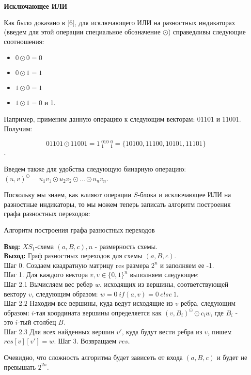 \documentclass[a4paper,12pt]{extarticle}
\theoremstyle{plain} %
\begin{document}
\begin{large}
\textbf{Исключающее ИЛИ}

 Как было доказано в [6], для исключающего ИЛИ на разностных индикаторах (введем для этой операции специальное обозначение $\odot$) справедливы следующие соотношения:

\begin{itemize}
\item $0 \odot 0 = 0$
\item $0 \odot 1 = 1$
\item $1 \odot 0= 1$
\item $1 \odot 1 = 0$ и 1. 
\end{itemize}

Например, применим данную операцию к следующим векторам: 01101 и 11001. Получим:

$$01101 \odot 11001 = 1~_{1}^010~_{1}^0 = \{10100, 11100, 10101, 11101\}$$.

Введем также для удобства следующую бинарную операцию: $(u, v)^{\odot} = u_1v_1 \odot u_2v_2 \odot ... \odot u_nv_n$.

Поскольку мы знаем, как влияют операции $S$-блока и исключающее ИЛИ на разностные индикаторы, то мы можем теперь записать алгоритм построения графа разностных переходов:

\begin{algorithm}[H]
\caption{Алгоритм построения графа разностных переходов}
\label{diff_graph_construct}
\textbf{Вход:} $XS_1$-схема $(a, B, c), n$ - размерность схемы.\\
\textbf{Выход:} Граф разностных переходов для схемы $(a, B, c)$.\\
Шаг 0. Создаем квадратную матрицу res размера $2^n$ и заполняем ее -1. \\
Шаг 1. Для каждого вектора $v, v \in \{0, 1\}^n$ выполняем следующее: \\
Шаг 2.1 Вычисляем вес ребер $w$, исходящих из вершины, соответствующей вектору $v$, следующим образом: $w = 0~ if (a,v) = 0 ~else ~1$.\\
Шаг 2.2 Находим все вершины, куда ведут исходящие из $v$ ребра, следующим образом: $i$-тая координата вершины определяется как $(v, B_i)^{\odot} \odot c_iw$, где $B_i$ - это $i$-тый столбец $B$. \\
Шаг 2.3 Для всех найденных вершин $v'$, куда будут вести ребра из $v$, пишем $res[v][v'] = w$.
Шаг 3. Возвращаем $res$.\\
\end{algorithm}

Очевидно, что сложность алгоритма будет зависеть от входа $(a,B,c)$ и будет не превышать $2^{2n}$.


\end{large}
\end{document}
